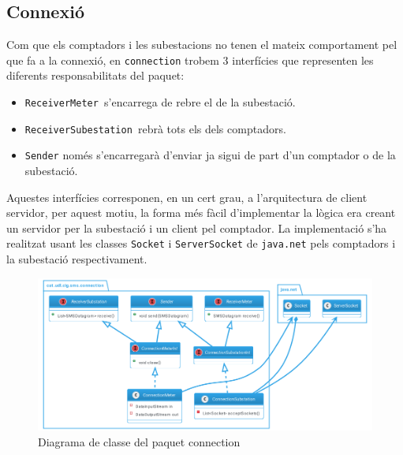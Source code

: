 \subsection{Connexió}
Com que els comptadors i les subestacions no tenen el mateix comportament pel que fa a la connexió, en \texttt{connection} trobem 3 interfícies que representen les diferents responsabilitats del paquet:
\begin{itemize}
	\item \texttt{ReceiverMeter }s'encarrega de rebre el \dto de la subestació.
	\item \texttt{ReceiverSubestation }rebrà tots els \dto dels comptadors.
	\item \texttt{Sender} només s'encarregarà d'enviar \dto ja sigui de part d'un comptador o de la subestació.
\end{itemize}
Aquestes interfícies corresponen, en un cert grau, a l'arquitectura de client servidor, per aquest motiu, la forma més fàcil d'implementar la lògica era creant un servidor per la subestació i un client pel comptador.
La implementació s'ha realitzat usant les classes \texttt{Socket} i \texttt{ServerSocket} de \texttt{java.net} pels comptadors i la subestació respectivament.
\begin{figure}[H]
	\centering
	\includegraphics[width=16cm]{classes/connection.png}
	\caption{Diagrama de classe del paquet connection}
	\label{fig:connection}
\end{figure}
